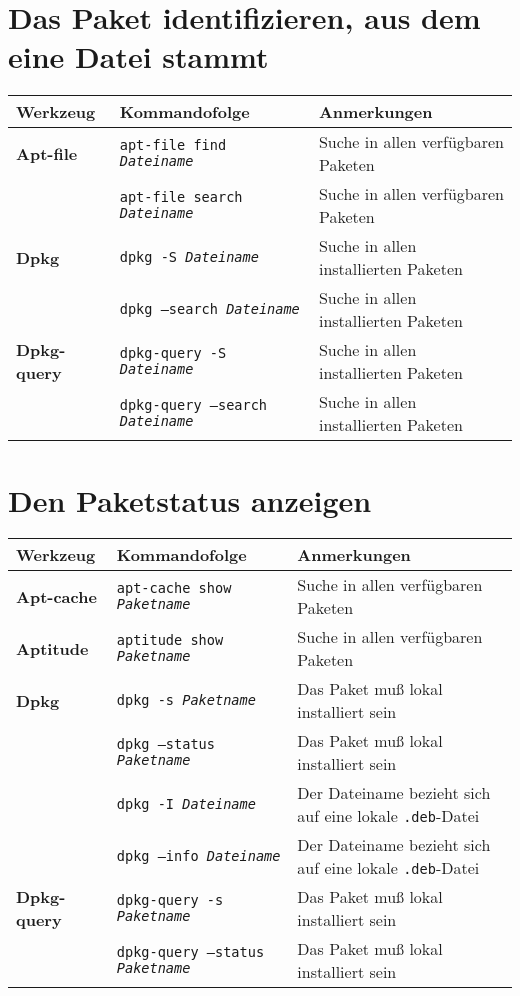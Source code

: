 \documentclass[10pt,a4paper]{article}
\begin{document}
\section{Das Paket identifizieren, aus dem eine Datei stammt}
\begin{tabular}{ p{3.5cm} p{9.6cm} p{11cm}}
  \hline
  \rowcolor{Gray}
  \textbf{Werkzeug} & \textbf{Kommandofolge} & \textbf{Anmerkungen} \\
  \hline 
  \textbf{Apt-file} & \texttt{apt-file find \textit{Dateiname}} & Suche in allen verfügbaren Paketen\\
  \rowcolor{Gray}
  & \texttt{apt-file search \textit{Dateiname}} & Suche in allen verfügbaren Paketen\\
  \textbf{Dpkg} & \texttt{dpkg -S \textit{Dateiname}} & Suche in allen installierten Paketen\\
  \rowcolor{Gray}
  & \texttt{dpkg --search \textit{Dateiname}} & Suche in allen installierten Paketen \\
  \textbf{Dpkg-query} & \texttt{dpkg-query -S \textit{Dateiname}} & Suche in allen installierten Paketen\\
  \rowcolor{Gray}
  & \texttt{dpkg-query --search \textit{Dateiname}} & Suche in allen installierten Paketen \\
  \hline
\end{tabular}

\section{Den Paketstatus anzeigen}
\begin{tabular}{ p{3.5cm} p{9.6cm} p{11cm}}
  \hline
  \rowcolor{Gray}
  \textbf{Werkzeug} & \textbf{Kommandofolge} & \textbf{Anmerkungen} \\
  \hline 
  \textbf{Apt-cache} & \texttt{apt-cache show \textit{Paketname}} & Suche in allen verfügbaren Paketen\\
  \rowcolor{Gray}
  \textbf{Aptitude} & \texttt{aptitude show \textit{Paketname}} & Suche in allen verfügbaren Paketen\\
  \textbf{Dpkg} & \texttt{dpkg -s \textit{Paketname}} & Das Paket muß lokal installiert sein \\
  \rowcolor{Gray}
  & \texttt{dpkg --status \textit{Paketname}} & Das Paket muß lokal installiert sein\\
  & \texttt{dpkg -I \textit{Dateiname}} & Der Dateiname bezieht sich auf eine lokale \texttt{.deb}-Datei \\
  \rowcolor{Gray}
  & \texttt{dpkg --info \textit{Dateiname}} & Der Dateiname bezieht sich auf eine lokale \texttt{.deb}-Datei\\
  \textbf{Dpkg-query} & \texttt{dpkg-query -s \textit{Paketname}} & Das Paket muß lokal installiert sein\\
  \rowcolor{Gray}
  & \texttt{dpkg-query --status \textit{Paketname}} & Das Paket muß lokal installiert sein \\
  \hline
\end{tabular}
\end{document}
